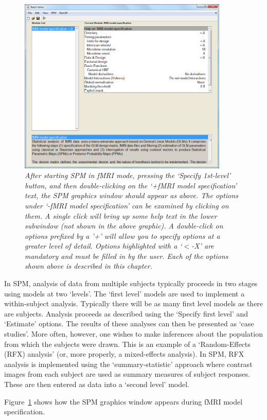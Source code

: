 \documentclass[a4paper,titlepage]{book}
\begin{document}
\begin{figure}
\includegraphics[width=100mm]{fmri_model}
\caption{\em After starting SPM in fMRI mode, pressing the `Specify 1st-level' button, and then double-clicking on the `+fMRI model specification' text, the SPM graphics window should appear as above. The options under `-fMRI model specification' can be examined by clicking on them. A single click will bring up some help text in the lower subwindow (not shown in the above graphic). 
A double-click on options prefixed by a '+' will allow you to specify 
options at a greater level of detail. Options highlighted with a `$<$-X' are mandatory and must be filled in by the user. Each of the options shown above is described in this chapter. \label{spec}}
\end{figure}


In SPM, analysis of data from multiple subjects typically proceeds in two stages using models at two `levels'. The `first level' models are used to implement a within-subject analysis. Typically there will be as many first level models as there are subjects. Analysis proceeds as described using the `Specify first level' and `Estimate' options. The results of these analyses can then be presented as `case studies'. More often, however, one wishes to make inferences about the population from which the subjects were drawn. This is an example of a `Random-Effects (RFX) analysis' (or, more properly, a mixed-effects analysis). In SPM, RFX analysis is implemented using the `summary-statistic' approach where contrast images from each subject are used as summary measures of subject responses. These are then entered as data into a `second level' model. 

Figure~\ref{spec} shows how the SPM graphics window appears during 
fMRI model specification. 
\end{document}
